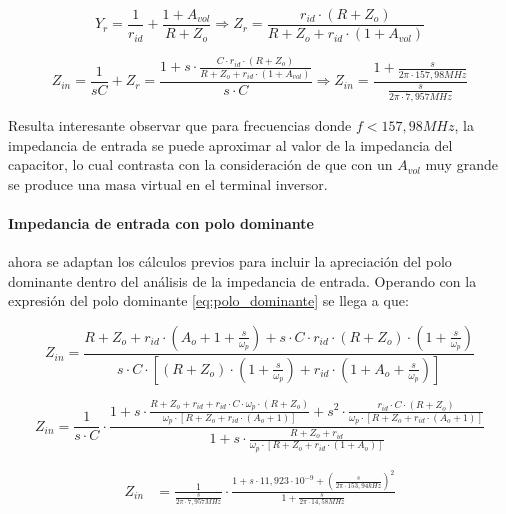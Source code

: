 \begin{equation*}
	Y_r = \frac{1}{r_{id}} + \frac{1 + A_{vol}}{R + Z_o} \Rightarrow
	Z_r = \frac{r_{id} \cdot(R + Z_o)}{R + Z_o + r_{id} \cdot(1 + A_{vol})}
\end{equation*}

\begin{equation}
	Z_{in} = \frac{1}{sC} + Z_r
	= \frac{1 + s \cdot \frac{C \cdot r_{id} \cdot (R + Z_o)}{R + Z_o + r_{id} \cdot (1 + A_{vol})}}{s \cdot C}
	\Rightarrow
	Z_{in} = \frac{1 + \frac{s}{2 \pi \cdot 157,98MHz}}{\frac{s}{2 \pi \cdot 7,957MHz}}
	\label{eq:derivador_impedancia_avol_finito}
\end{equation}

Resulta interesante observar que para frecuencias donde $f < 157,98 MHz$, la impedancia de entrada se puede aproximar al valor de la impedancia del capacitor, lo cual contrasta con la consideraci\'on de que con un $A_{vol}$ muy grande se produce una masa virtual en el terminal inversor. 

\paragraph*{Impedancia de entrada con polo dominante} ahora se adaptan los c\'alculos previos para incluir la apreciaci\'on del polo dominante dentro del an\'alisis de la impedancia de entrada. Operando con la expresi\'on del polo dominante \ref{eq:polo_dominante} se llega a que:

\begin{equation*}
	Z_{in} = \frac{R + Z_o + r_{id} \cdot (A_o + 1 + \frac{s}{\omega_p}) + s \cdot C \cdot r_{id} \cdot (R + Z_o) \cdot (1 + \frac{s}{\omega_p})}{s \cdot C \cdot \left[ (R + Z_o) \cdot (1 + \frac{s}{\omega_p}) + r_{id} \cdot (1 + A_o + \frac{s}{\omega_p}) \right]}
\end{equation*}

\begin{equation*}
	Z_{in} = \frac{1}{s \cdot C} \cdot 
	\frac{1 + s \cdot \frac{R + Z_o + r_{id} + r_{id} \cdot C \cdot \omega_p \cdot(R + Z_o)}{\omega_p \cdot \left[ R + Z_o + r_{id} \cdot (A_o + 1) \right]} + s^{2} \cdot \frac{r_{id} \cdot C \cdot (R + Z_o)}{\omega_p \cdot \left[ R + Z_o + r_{id} \cdot (A_o + 1) \right]}}{1 + s \cdot \frac{R + Z_o + r_{id}}{\omega_p \cdot \left[ R + Z_o + r_{id} \cdot (1 + A_o)\right]}}
\end{equation*}

\begin{align}
	Z_{in} & = \frac{1}{\frac{s}{2 \pi \cdot 7,957MHz}} \cdot
	\frac{1 + s \cdot 11,923 \cdot 10^{-9} + \left(\frac{s}{2 \pi \cdot 153,94kHz}\right)^{2}}{1 + \frac{s}{2 \pi \cdot 14,58MHz}}
	\label{eq:derivador_impedancia_polo_dominante}
\end{align}

